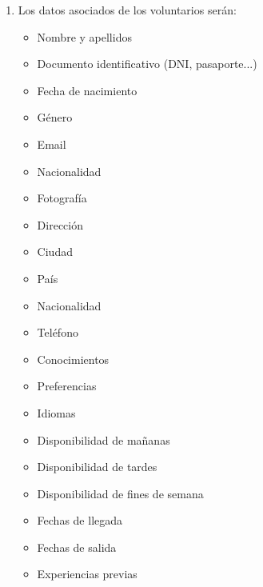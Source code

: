 \begin{enumerate}[start=6,label={RNF-\arabic*.}]
\begin{itemize}
        \end{itemize}
    \item Los datos asociados de los voluntarios serán:
        \begin{itemize}
            \item Nombre y apellidos
            \item Documento identificativo (DNI, pasaporte...)
            \item Fecha de nacimiento
            \item Género
            \item Email
            \item Nacionalidad
            \item Fotografía
            \item Dirección
            \item Ciudad
            \item País
            \item Nacionalidad
            \item Teléfono
            \item Conocimientos
            \item Preferencias
            \item Idiomas
            \item Disponibilidad de mañanas
            \item Disponibilidad de tardes
            \item Disponibilidad de fines de semana
            \item Fechas de llegada
            \item Fechas de salida
            \item Experiencias previas
        \end{itemize} 
        

\end{enumerate}
